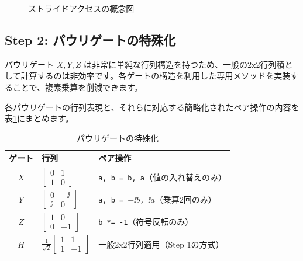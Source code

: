 \begin{figure}[htbp]
\caption{ストライドアクセスの概念図}
\label{fig:stride_access}
\end{figure}

\subsection{Step 2: パウリゲートの特殊化}

パウリゲート $X, Y, Z$ は非常に単純な行列構造を持つため、一般の2x2行列積として計算するのは非効率です。各ゲートの構造を利用した専用メソッドを実装することで、複素乗算を削減できます。

各パウリゲートの行列表現と、それらに対応する簡略化されたペア操作の内容を表\ref{tab:pauli_specialization}にまとめます。

\begin{table}[htbp]
\centering
\begin{tabular}{cll}
\hline
\textbf{ゲート} & \textbf{行列} & \textbf{ペア操作} \\ \hline
$X$ & $\begin{bmatrix}0&1\\1&0\end{bmatrix}$ & \texttt{a, b = b, a}（値の入れ替えのみ） \\
$Y$ & $\begin{bmatrix}0&-\ii\\ \ii&0\end{bmatrix}$ & \texttt{a, b = $-\ii b$, $\ii a$}（乗算2回のみ） \\
$Z$ & $\begin{bmatrix}1&0\\0&-1\end{bmatrix}$ & \texttt{b *= -1}（符号反転のみ） \\
$H$ & $\frac{1}{\sqrt{2}}\begin{bmatrix}1&1\\1&-1\end{bmatrix}$ & 一般2x2行列適用（Step 1の方式） \\ \hline
\end{tabular}
\caption{パウリゲートの特殊化}
\label{tab:pauli_specialization}
\end{table}

